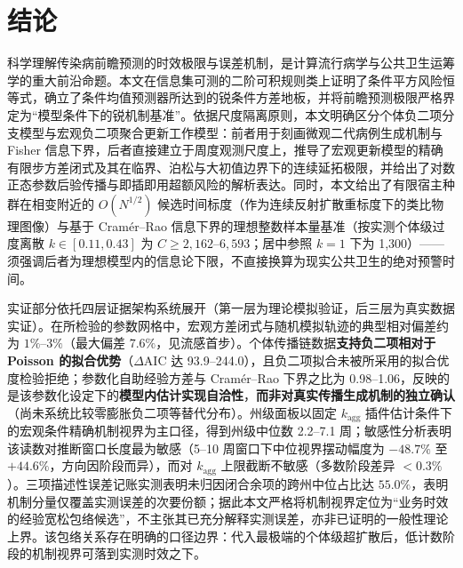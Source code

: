 \documentclass[11pt,a4paper]{article}
\theoremstyle{plain}
\theoremstyle{definition}
\begin{document}
\section{结论}\label{sec:conclusion}

科学理解传染病前瞻预测的时效极限与误差机制，是计算流行病学与公共卫生运筹学的重大前沿命题。本文在信息集可测的二阶可积规则类上证明了条件平方风险恒等式，确立了条件均值预测器所达到的锐条件方差地板，并将前瞻预测极限严格界定为“模型条件下的锐机制基准”。依据尺度隔离原则，本文明确区分个体负二项分支模型与宏观负二项聚合更新工作模型：前者用于刻画微观二代病例生成机制与 Fisher 信息下界，后者直接建立于周度观测尺度上，推导了宏观更新模型的精确有限步方差闭式及其在临界、泊松与大初值边界下的连续延拓极限，并给出了对数正态参数后验传播与即插即用超额风险的解析表达。同时，本文给出了有限宿主种群在相变附近的 $O(N^{1/2})$ 候选时间标度（作为连续反射扩散重标度下的类比物理图像）与基于 Cramér--Rao 信息下界的理想整数样本量基准（按实测个体级过度离散 $k \in [0.11, 0.43]$ 为 $C \ge 2{,}162$--$6{,}593$；居中参照 $k=1$ 下为 1,300）——须强调后者为理想模型内的信息论下限，不直接换算为现实公共卫生的绝对预警时间。

实证部分依托四层证据架构系统展开（第一层为理论模拟验证，后三层为真实数据实证）。在所检验的参数网格中，宏观方差闭式与随机模拟轨迹的典型相对偏差约为 $1\%$--$3\%$（最大偏差 $7.6\%$，见流感首步）。个体传播链数据\textbf{支持负二项相对于 Poisson 的拟合优势}（$\Delta\text{AIC}$ 达 93.9--244.0），且负二项拟合未被所采用的拟合优度检验拒绝；参数化自助经验方差与 Cramér--Rao 下界之比为 0.98--1.06，反映的是该参数化设定下的\textbf{模型内估计实现自洽性}，\textbf{而非对真实传播生成机制的独立确认}（尚未系统比较零膨胀负二项等替代分布）。州级面板以固定 $k_{\text{agg}}$ 插件估计条件下的宏观条件精确机制视界为主口径，得到州级中位数 2.2--7.1 周；敏感性分析表明该读数对推断窗口长度最为敏感（5--10 周窗口下中位视界摆动幅度为 $-48.7\%$ 至 $+44.6\%$，方向因阶段而异），而对 $k_{\text{agg}}$ 上限截断不敏感（多数阶段差异 $<0.3\%$）。三项描述性误差记账实测表明未归因闭合余项的跨州中位占比达 $55.0\%$，表明机制分量仅覆盖实测误差的次要份额；据此本文严格将机制视界定位为“业务时效的经验宽松包络候选”，不主张其已充分解释实测误差，亦非已证明的一般性理论上界。该包络关系存在明确的口径边界：代入最极端的个体级超扩散后，低计数阶段的机制视界可落到实测时效之下。
\end{document}
